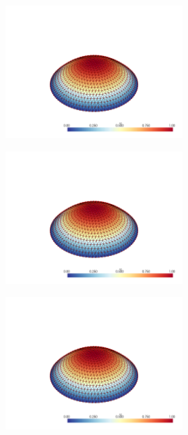 \documentclass[
  11pt,
]{article}
\let\origfigure\figure
\let\endorigfigure\endfigure
\renewenvironment{figure}[1][2] {
    \expandafter\origfigure\expandafter[H]
} {
    \endorigfigure
}
\begin{document}
\begin{figure}
\centering
\includegraphics[width=0.5\textwidth,height=\textheight]{../img/mesh3-gauss05.png}
\caption{Finite element solution for problem 1 over mesh number 3 and
order-5 numerical integration.}
\end{figure}

\begin{figure}
\centering
\includegraphics[width=0.5\textwidth,height=\textheight]{../img/mesh3-gauss08.png}
\caption{Finite element solution for problem 1 over mesh number 3 and
order-8 numerical integration.}
\end{figure}

\begin{figure}
\centering
\includegraphics[width=0.5\textwidth,height=\textheight]{../img/mesh3-gauss13.png}
\caption{Finite element solution for problem 1 over mesh number 3 and
order-13 numerical integration.}
\end{figure}
\end{document}
